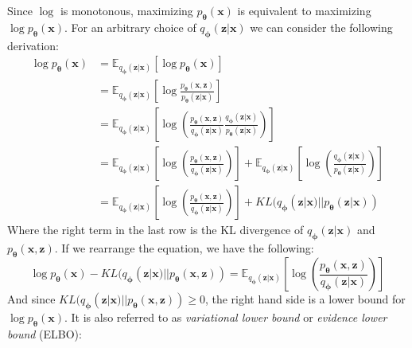 \documentclass[12pt]{report}
\theoremstyle{definition}
\begin{document}
Since $\log$ is monotonous, maximizing $p_{\mathbf{\theta}}(\mathbf{x})$ is equivalent to maximizing $\log p_{\mathbf{\theta}}(\mathbf{x})$. For an arbitrary choice of $q_{\mathbf{\phi}}(\mathbf{z}|\mathbf{x})$ we can consider the following derivation:
\begin{equation}
\begin{split}
	\log p_{\mathbf{\theta}}(\mathbf{x}) 
	& = \mathbb{E}_{q_{\mathbf{\phi}}(\mathbf{z}|\mathbf{x})}\left[\log p_{\mathbf{\theta}}(\mathbf{x})\right] \\
	& = \mathbb{E}_{q_{\mathbf{\phi}}(\mathbf{z}|\mathbf{x})}\left[ \log \frac{p_{\mathbf{\theta}}(\mathbf{x}, \mathbf{z})}{p_{\mathbf{\theta}}(\mathbf{z}|\mathbf{x})} \right] \\
	& = \mathbb{E}_{q_{\mathbf{\phi}}(\mathbf{z}|\mathbf{x})}\left[ \log\left(\frac{p_{\mathbf{\theta}}(\mathbf{x}, \mathbf{z})}{q_{\mathbf{\phi}}(\mathbf{z}|\mathbf{x})}\frac{q_{\mathbf{\phi}}(\mathbf{z}|\mathbf{x})}{p_{\mathbf{\theta}}(\mathbf{z}|\mathbf{x})} \right) \right] \\
	& = \mathbb{E}_{q_{\mathbf{\phi}}(\mathbf{z}|\mathbf{x})}\left[ \log\left(\frac{p_{\mathbf{\theta}}(\mathbf{x}, \mathbf{z})}{q_{\mathbf{\phi}}(\mathbf{z}|\mathbf{x})}\right) \right] + \mathbb{E}_{q_{\mathbf{\phi}}(\mathbf{z}|\mathbf{x})}\left[ \log\left(\frac{q_{\mathbf{\phi}}(\mathbf{z}|\mathbf{x})}{p_{\mathbf{\theta}}(\mathbf{z}|\mathbf{x})} \right) \right] \\
	& = \mathbb{E}_{q_{\mathbf{\phi}}(\mathbf{z}|\mathbf{x})}\left[ \log\left(\frac{p_{\mathbf{\theta}}(\mathbf{x}, \mathbf{z})}{q_{\mathbf{\phi}}(\mathbf{z}|\mathbf{x})}\right) \right] + KL(q_{\mathbf{\phi}}(\mathbf{z}|\mathbf{x}) || p_{\mathbf{\theta}}(\mathbf{z}| \mathbf{x})) 
\end{split}
\end{equation}
Where the right term in the last row is the KL divergence of $q_{\mathbf{\phi}}(\mathbf{z}|\mathbf{x})$ and $p_{\mathbf{\theta}}(\mathbf{x}, \mathbf{z})$. If we rearrange the equation, we have the following:
\begin{equation}
	\log p_{\mathbf{\theta}}(\mathbf{x}) - KL(q_{\mathbf{\phi}}(\mathbf{z}|\mathbf{x}) || p_{\mathbf{\theta}}(\mathbf{x}, \mathbf{z})) = \mathbb{E}_{q_{\mathbf{\phi}}(\mathbf{z}|\mathbf{x})}\left[ \log\left(\frac{p_{\mathbf{\theta}}(\mathbf{x}, \mathbf{z})}{q_{\mathbf{\phi}}(\mathbf{z}|\mathbf{x})}\right) \right]
\end{equation}
	And since $KL(q_{\mathbf{\phi}}(\mathbf{z}|\mathbf{x}) || p_{\mathbf{\theta}}(\mathbf{x}, \mathbf{z})) \geq 0$, the right hand side is a lower bound for $\log p_{\mathbf{\theta}}(\mathbf{x})$. It is also referred to as \emph{variational lower bound} or \emph{evidence lower bound} (ELBO):
\end{document}
